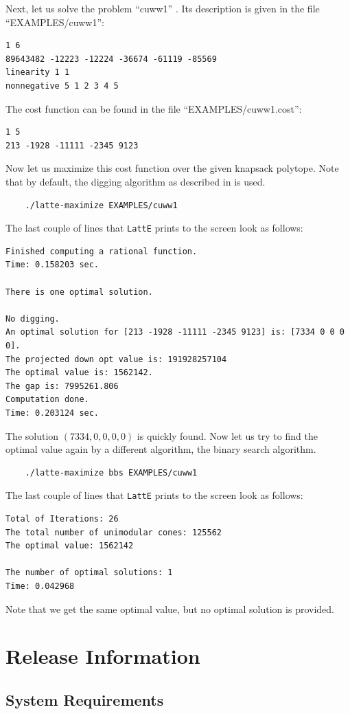\documentclass{article}
\begin{document}
Next, let us solve the problem ``cuww1'' \cite{cuww,latte3}. Its
description is given in the file ``EXAMPLES/cuww1'': 
\begin{verbatim}
1 6
89643482 -12223 -12224 -36674 -61119 -85569
linearity 1 1
nonnegative 5 1 2 3 4 5
\end{verbatim}
The cost function can be found in the file ``EXAMPLES/cuww1.cost'':
\begin{verbatim}
1 5
213 -1928 -11111 -2345 9123 
\end{verbatim}
Now let us maximize this cost function over the given knapsack
polytope. Note that by default, the digging algorithm as described in
\cite{latte3} is used.
\begin{verbatim}
    ./latte-maximize EXAMPLES/cuww1
\end{verbatim}
The last couple of lines that {\tt LattE} prints to the screen
look as follows:
{\small
\begin{verbatim}
Finished computing a rational function. 
Time: 0.158203 sec.

There is one optimal solution. 		

No digging.
An optimal solution for [213 -1928 -11111 -2345 9123] is: [7334 0 0 0 0].
The projected down opt value is: 191928257104
The optimal value is: 1562142.
The gap is: 7995261.806
Computation done.
Time: 0.203124 sec.
\end{verbatim}
}
The solution $(7334,0,0,0,0)$ is quickly found. Now let us try to
find the optimal value again by a different algorithm, the binary
search algorithm.
\begin{verbatim}
    ./latte-maximize bbs EXAMPLES/cuww1
\end{verbatim}
The last couple of lines that {\tt LattE} prints to the screen
look as follows:
\begin{verbatim}
Total of Iterations: 26
The total number of unimodular cones: 125562
The optimal value: 1562142

The number of optimal solutions: 1
Time: 0.042968
\end{verbatim}
Note that we get the same optimal value, but no optimal solution is
provided.	
\section{Release Information}

\subsection{System Requirements}
\end{document}
